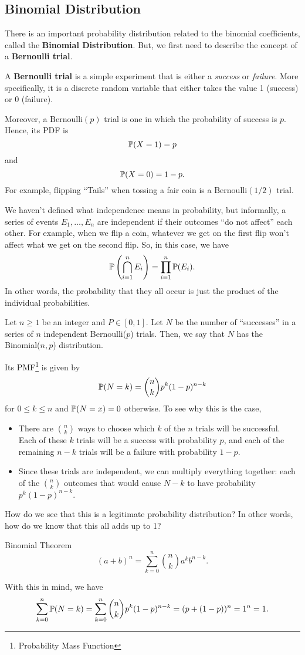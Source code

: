 \documentclass[letterpaper]{article}
\begin{document}
\subsection{Binomial Distribution}
There is an important probability distribution related to the binomial coefficients, called the \textbf{Binomial Distribution}. But, we first need to describe the concept of a \textbf{Bernoulli trial}.
\begin{definition}{}{}
    A \textbf{Bernoulli trial} is a simple experiment that is either a \emph{success} or \emph{failure}. More specifically, it is a discrete random variable that either takes the value 1 (success) or 0 (failure).
\end{definition}
Moreover, a $\text{Bernoulli}(p)$ trial is one in which the probability of success is $p$. Hence, its PDF is 
\[\mathbb{P}(X = 1) = p\]
and 
\[\mathbb{P}(X = 0) = 1 - p.\]
For example, flipping ``Tails'' when tossing a fair coin is a $\text{Bernoulli}(1 / 2)$ trial. 

\bigskip 

We haven't defined what independence means in probability, but informally, a series of events $E_1, \dots, E_n$ are independent if their outcomes ``do not affect'' each other. For example, when we flip a coin, whatever we get on the first flip won't affect what we get on the second flip. So, in this case, we have 
\[\mathbb{P}\left(\bigcap_{i = 1}^{n} E_i\right) = \prod_{i = 1}^{n} \mathbb{P}(E_i).\]
In other words, the probability that they all occur is just the product of the individual probabilities. 

\begin{definition}{}{}
    Let $n \geq 1$ be an integer and $P \in [0, 1]$. Let $N$ be the number of ``successes'' in a series of $n$ independent Bernoulli($p$) trials. Then, we say that $N$ has the Binomial($n, p$) distribution.
\end{definition}
Its PMF\footnote{Probability Mass Function} is given by 
\[\mathbb{P}(N = k) = \binom{n}{k}p^k (1 - p)^{n - k}\]
for $0 \leq k \leq n$ and $\mathbb{P}(N = x) = 0$ otherwise. To see why this is the case,
\begin{itemize}
    \item There are $\binom{n}{k}$ ways to choose which $k$ of the $n$ trials will be successful. Each of these $k$ trials will be a success with probability $p$, and each of the remaining $n - k$ trials will be a failure with probability $1 - p$. 
    \item Since these trials are independent, we can multiply everything together: each of the $\binom{n}{k}$ outcomes that would cause $N - k$ to have probability $p^k (1 - p)^{n - k}$. 
\end{itemize}
How do we see that this is a legitimate probability distribution? In other words, how do we know that this all adds up to 1? 
\begin{theorem}{Binomial Theorem}{}
    \[(a + b)^n = \sum_{k = 0}^{n} \binom{n}{k} a^k b^{n - k}.\]
\end{theorem}
With this in mind, we have 
\[\sum_{k = 0}^{n} \mathbb{P}(N = k) = \sum_{k = 0}^{n} \binom{n}{k} p^k (1 - p)^{n - k} = (p + (1 - p))^n = 1^n = 1.\]
\end{document}
